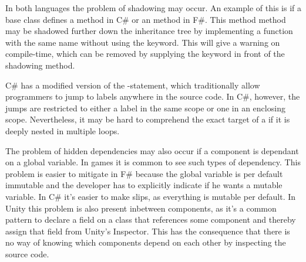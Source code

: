 In both languages the problem of shadowing may occur. An example of this is if a base class defines a  method in C\# or an  method in F\#. This method method may be shadowed further down the inheritance tree by implementing a function with the same name without using the  keyword. This will give a warning on compile-time, which can be removed by supplying the  keyword in front of the shadowing method.

C\# has a modified version of the -statement, which traditionally allow programmers to jump to labels anywhere in the source code. In C\#, however, the jumps are restricted to either a label in the same scope or one in an enclosing scope\cite{csharp:goto}. Nevertheless, it may be hard to comprehend the exact target of a  if it is deeply nested in multiple loops. 

The problem of hidden dependencies may also occur if a component is dependant on a global variable. In games it is common to see such types of dependency\cite{blow2004game, guana2015building, nystrom2014game}. This problem is easier to mitigate in F\# because the global variable is per default immutable and the developer has to explicitly indicate if he wants a mutable variable. In C\# it's easier to make slips, as everything is mutable per default. In Unity this problem is also present inbetween components, as it's a common pattern to declare a field on a class that references some component and thereby assign that field from Unity's Inspector\cite{unity:inspector:assignment}. This has the consequence that there is no way of knowing which components depend on each other by inspecting the source code.